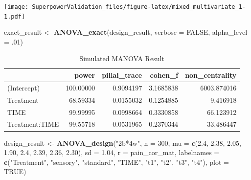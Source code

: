 \documentclass[
]{book}
\newenvironment{Shaded}{\begin{snugshade}}{\end{snugshade}}
\newcommand{\DataTypeTok}[1]{\textcolor[rgb]{0.13,0.29,0.53}{#1}}
\newcommand{\DecValTok}[1]{\textcolor[rgb]{0.00,0.00,0.81}{#1}}
\newcommand{\FloatTok}[1]{\textcolor[rgb]{0.00,0.00,0.81}{#1}}
\newcommand{\KeywordTok}[1]{\textcolor[rgb]{0.13,0.29,0.53}{\textbf{#1}}}
\newcommand{\NormalTok}[1]{#1}
\newcommand{\OtherTok}[1]{\textcolor[rgb]{0.56,0.35,0.01}{#1}}
\newcommand{\StringTok}[1]{\textcolor[rgb]{0.31,0.60,0.02}{#1}}
\begin{document}
\texttt{[image: SuperpowerValidation\_files/figure-latex/mixed\_multivariate\_1-1.pdf]}

\begin{Shaded}
\begin{Highlighting}[]
\NormalTok{exact_result <-}\StringTok{ }\KeywordTok{ANOVA_exact}\NormalTok{(design_result, }\DataTypeTok{verbose =} \OtherTok{FALSE}\NormalTok{,}
                            \DataTypeTok{alpha_level =} \FloatTok{.01}\NormalTok{)}
\end{Highlighting}
\end{Shaded}

\begin{table}[!h]

\caption{\label{tab:unnamed-chunk-162}Simulated MANOVA Result}
\centering
\begin{tabular}[t]{l|r|r|r|r}
\hline
  & power & pillai\_trace & cohen\_f & non\_centrality\\
\hline
(Intercept) & 100.00000 & 0.9094197 & 3.1685838 & 6003.874016\\
\hline
Treatment & 68.59334 & 0.0155032 & 0.1254885 & 9.416918\\
\hline
TIME & 99.99995 & 0.0998664 & 0.3330858 & 66.123912\\
\hline
Treatment:TIME & 99.55718 & 0.0531965 & 0.2370344 & 33.486447\\
\hline
\end{tabular}
\end{table}

\begin{Shaded}
\begin{Highlighting}[]
\NormalTok{design_result <-}\StringTok{ }\KeywordTok{ANOVA_design}\NormalTok{(}\StringTok{"2b*4w"}\NormalTok{,}
                              \DataTypeTok{n =} \DecValTok{300}\NormalTok{,}
                              \DataTypeTok{mu =} \KeywordTok{c}\NormalTok{(}\FloatTok{2.4}\NormalTok{, }\FloatTok{2.38}\NormalTok{, }\FloatTok{2.05}\NormalTok{, }\FloatTok{1.90}\NormalTok{,}
                                     \FloatTok{2.4}\NormalTok{, }\FloatTok{2.39}\NormalTok{, }\FloatTok{2.36}\NormalTok{, }\FloatTok{2.30}\NormalTok{),}
                              \DataTypeTok{sd =} \FloatTok{1.04}\NormalTok{,}
                              \DataTypeTok{r =}\NormalTok{ pain_cor_mat,}
                              \DataTypeTok{labelnames =} \KeywordTok{c}\NormalTok{(}\StringTok{"Treatment"}\NormalTok{, }\StringTok{"sensory"}\NormalTok{, }\StringTok{"standard"}\NormalTok{,}
                                             \StringTok{"TIME"}\NormalTok{, }\StringTok{"t1"}\NormalTok{, }\StringTok{"t2"}\NormalTok{, }\StringTok{"t3"}\NormalTok{, }\StringTok{"t4"}\NormalTok{),}
                              \DataTypeTok{plot =} \OtherTok{TRUE}\NormalTok{)}
\end{Highlighting}
\end{Shaded}
\end{document}
